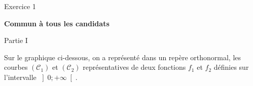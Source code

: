
%
\begin{h2}Exercice 1\end{h2}
\textbf{Commun  à tous les candidats}
\begin{h3} Partie I \end{h3}
Sur le graphique ci-dessous, on a représenté dans un repère orthonormal, les courbes $\left(\mathscr C_{1}\right)$ et $\left(\mathscr C_{2}\right)$ représentatives de deux fonctions $f_{1}$ et $f_{2}$ définies sur l'intervalle $\left]0;+\infty \right[$.

\begin{center}
\end{center}

